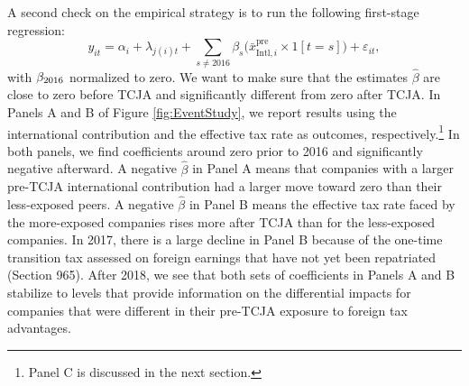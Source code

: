 \documentclass[11pt,letterpaper]{article}
\begin{document}
A second check on the empirical strategy
is to run the following 
first-stage regression:
\begin{equation}
  y_{it} =
  \alpha_i+\lambda_{j(i)t}
  +\sum_{s\neq 2016} \beta_s
  \bigl(\bar x^{\text{pre}}_{\text{Intl},i}\times 1[t=s]\bigr)
  +\varepsilon_{it},
\label{eq:FSregression}
\end{equation}
with $\beta_{\rm 2016}$ normalized to zero.
We want to make sure that the estimates $\hat\beta$ are
close to zero before TCJA and significantly different from
zero after TCJA.
In Panels A and B of Figure \ref{fig:EventStudy},
we report results using the international
contribution and the effective tax rate as outcomes, 
respectively.\footnote{Panel C is discussed in the next section.}
In both panels, we find coefficients around zero prior to 2016
and significantly negative afterward. A negative $\hat\beta$ in Panel A
means that companies with a larger pre-TCJA international contribution 
had a larger move toward zero than their less-exposed peers.
A negative $\hat\beta$ in Panel B means the effective tax
rate faced by the more-exposed companies rises more after TCJA 
than for the less-exposed companies.
In 2017, there is a large decline in Panel B
because of the one-time transition tax assessed 
on foreign earnings that have not yet been repatriated 
(Section 965).
After 2018, we see that both sets of coefficients 
in Panels A and B stabilize to levels that provide information on the differential 
impacts for companies that were different  in their pre-TCJA exposure
to foreign tax advantages.






%
%
\end{document}
